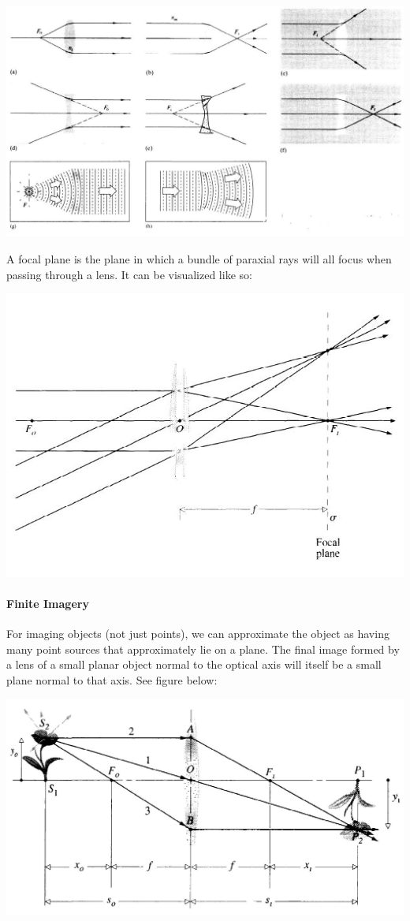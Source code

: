 \documentclass[12pt]{report}
\begin{document}
\includegraphics[scale=.45]{FocalPoint.jpg}

A focal plane is the plane in which a bundle of paraxial rays will all focus when passing through a lens. It can be visualized like so:

\includegraphics[scale=.75]{FocalPlane1.jpg}

\paragraph{Finite Imagery}

For imaging objects (not just points), we can approximate the object as having many point sources that approximately lie on a plane. The final image formed by a lens of a small planar object normal to the optical axis will itself be a small plane normal to that axis. See figure below:

\includegraphics[scale=.4]{FiniteImagery.jpg}
\end{document}
